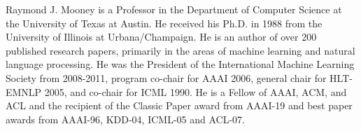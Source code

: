 Raymond J. Mooney is a Professor in the Department of Computer Science at the University of Texas at Austin. He received his Ph.D. in 1988 from the University of Illinois at Urbana/Champaign. He is an author of over 200 published research papers, primarily in the areas of machine learning and natural language processing. He was the President of the International Machine Learning Society from 2008-2011, program co-chair for AAAI 2006, general chair for HLT-EMNLP 2005, and co-chair for ICML 1990. He is a Fellow of AAAI, ACM, and ACL and the recipient of the Classic Paper award from AAAI-19 and best paper awards from AAAI-96, KDD-04, ICML-05 and ACL-07.